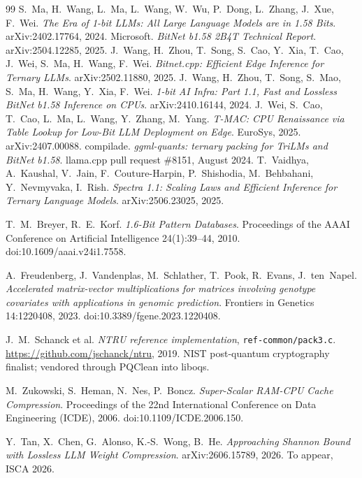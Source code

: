 \documentclass[11pt,a4paper]{article}
\newcommand{\code}[1]{\texttt{#1}}
\begin{document}
\begin{thebibliography}{99}
 S.~Ma, H.~Wang, L.~Ma, L.~Wang, W.~Wu, P.~Dong, L.~Zhang,
  J.~Xue, F.~Wei. \emph{The Era of 1-bit LLMs: All Large Language Models are in
  1.58 Bits}. arXiv:2402.17764, 2024.
 Microsoft. \emph{BitNet b1.58 2B4T Technical Report}.
  arXiv:2504.12285, 2025.
 J.~Wang, H.~Zhou, T.~Song, S.~Cao, Y.~Xia, T.~Cao, J.~Wei,
  S.~Ma, H.~Wang, F.~Wei. \emph{Bitnet.cpp: Efficient Edge Inference for Ternary
  LLMs}. arXiv:2502.11880, 2025.
 J.~Wang, H.~Zhou, T.~Song, S.~Mao, S.~Ma, H.~Wang, Y.~Xia,
  F.~Wei. \emph{1-bit AI Infra: Part 1.1, Fast and Lossless BitNet b1.58
  Inference on CPUs}. arXiv:2410.16144, 2024.
 J.~Wei, S.~Cao, T.~Cao, L.~Ma, L.~Wang, Y.~Zhang, M.~Yang.
  \emph{T-MAC: CPU Renaissance via Table Lookup for Low-Bit LLM Deployment on
  Edge}. EuroSys, 2025. arXiv:2407.00088.
 compilade. \emph{ggml-quants: ternary packing for TriLMs and
  BitNet b1.58}. llama.cpp pull request \#8151, August 2024.
 T.~Vaidhya, A.~Kaushal, V.~Jain, F.~Couture-Harpin,
  P.~Shishodia, M.~Behbahani, Y.~Nevmyvaka, I.~Rish. \emph{Spectra 1.1: Scaling
  Laws and Efficient Inference for Ternary Language Models}. arXiv:2506.23025,
  2025.

 T.~M.~Breyer, R.~E.~Korf. \emph{1.6-Bit Pattern
  Databases}. Proceedings of the AAAI Conference on Artificial Intelligence
  24(1):39--44, 2010. doi:10.1609/aaai.v24i1.7558.

 A.~Freudenberg, J.~Vandenplas, M.~Schlather, T.~Pook,
  R.~Evans, J.~ten~Napel. \emph{Accelerated matrix-vector multiplications for
  matrices involving genotype covariates with applications in genomic
  prediction}. Frontiers in Genetics 14:1220408, 2023.
  doi:10.3389/fgene.2023.1220408.

 J.~M.~Schanck et al. \emph{NTRU reference implementation},
  \code{ref-common/pack3.c}. \url{https://github.com/jschanck/ntru}, 2019.
  NIST post-quantum cryptography finalist; vendored through PQClean into
  liboqs.

 M.~Zukowski, S.~Heman, N.~Nes, P.~Boncz. \emph{Super-Scalar
  RAM-CPU Cache Compression}. Proceedings of the 22nd International Conference
  on Data Engineering (ICDE), 2006. doi:10.1109/ICDE.2006.150.

 Y.~Tan, X.~Chen, G.~Alonso, K.-S.~Wong, B.~He.
  \emph{Approaching Shannon Bound with Lossless LLM Weight Compression}.
  arXiv:2606.15789, 2026. To appear, ISCA 2026.


\end{thebibliography}
\end{document}
